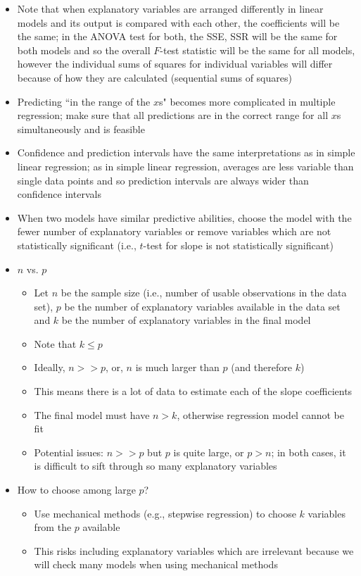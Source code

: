 \documentclass[12pt]{article}
\begin{document}
\begin{itemize}
\item Note that when explanatory variables are arranged differently in linear models and its output is compared with each other, the coefficients will be the same; in the ANOVA test for both, the SSE, SSR will be the same for both models and so the overall $F$-test statistic will be the same for all models, however the individual sums of squares for individual variables will differ because of how they are calculated (sequential sums of squares) 
\item Predicting ``in the range of the $x$s" becomes more complicated in multiple regression; make sure that all predictions are in the correct range for all $x$s simultaneously and is feasible 
\item Confidence and prediction intervals have the same interpretations as in simple linear regression; as in simple linear regression, averages are less variable than single data points and so prediction intervals are always wider than confidence intervals 
\item When two models have similar predictive abilities, choose the model with the fewer number of explanatory variables or remove variables which are not statistically significant (i.e., $t$-test for slope is not statistically significant) 
\item $n$ vs. $p$ \begin{itemize} 
\item Let $n$ be the sample size (i.e., number of usable observations in the data set), $p$ be the number of explanatory variables available in the data set and $k$ be the number of explanatory variables in the final model  
\item Note that $k \leq p$
\item Ideally, $n >> p$, or, $n$ is much larger than $p$ (and therefore $k$)
\item This means there is a lot of data to estimate each of the slope coefficients 
\item The final model must have $n > k$, otherwise regression model cannot be fit
\item Potential issues: $n >> p$ but $p$ is quite large, or $p > n$; in both cases, it is difficult to sift through so many explanatory variables \end{itemize} 
\item How to choose among large $p$? \begin{itemize} 
\item Use mechanical methods (e.g., stepwise regression) to choose $k$ variables from the $p$ available
\item This risks including explanatory variables which are irrelevant because we will check many models when using mechanical methods \end{itemize} 
\end{itemize}
\end{document}
